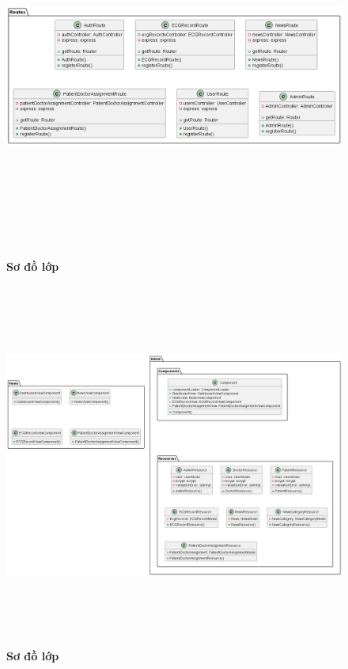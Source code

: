 \begin{enumerate}[a)]
\begin{figure}[H]
  \centering
  \includegraphics[width=15cm,height=12cm]{Images/server/class/class_route.png}
  \caption[Sơ đồ lớp]{\bfseries \fontsize{12pt}{0pt}\selectfont Sơ đồ lớp}
  \label{hinh2} %
\end{figure}


\begin{figure}[H]
  \centering
  \includegraphics[width=15cm,height=12cm]{Images/server/class/class_admin.png}
  \caption[Sơ đồ lớp]{\bfseries \fontsize{12pt}{0pt}\selectfont Sơ đồ lớp}
  \label{hinh2} %
\end{figure}



\end{enumerate}
